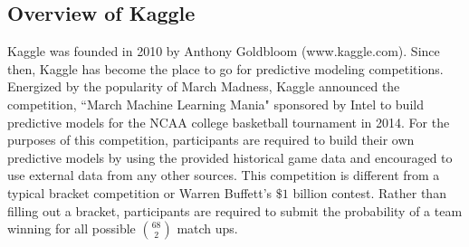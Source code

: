 \subsection{Overview of Kaggle}
Kaggle was founded in 2010 by Anthony Goldbloom (www.kaggle.com). Since then, Kaggle has become the place to go for predictive modeling competitions. Energized by the popularity of March Madness, Kaggle announced the competition, ``March Machine Learning Mania" sponsored by Intel to build predictive models for the NCAA college basketball tournament in 2014. For the purposes of this competition, participants are required to build their own predictive models by using the provided historical game data and encouraged to use external data from any other sources. This competition is different from a typical bracket competition or Warren Buffett's $\$ 1$ billion contest. Rather than filling out a bracket, participants are required to submit the probability of a team winning for all possible $68 \choose 2$ match ups.

